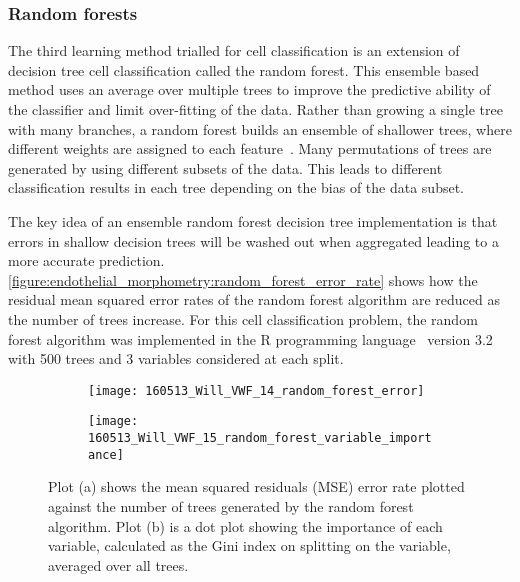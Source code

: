 \subsubsection{Random forests}
The third learning method trialled for cell classification is an extension of decision tree cell classification called the random forest. This ensemble based method uses an average over multiple trees to improve the predictive ability of the classifier and limit over-fitting of the data. Rather than growing a single tree with many branches, a random forest builds an ensemble of shallower trees, where different weights are assigned to each feature~\cite{Breiman2001}. Many permutations of trees are generated by using different subsets of the data. This leads to different classification results in each tree depending on the bias of the data subset.

The key idea of an ensemble random forest decision tree implementation is that errors in shallow decision trees will be washed out when aggregated leading to a more accurate prediction. \autoref{figure:endothelial_morphometry:random_forest_error_rate} shows how the residual mean squared error rates of the random forest algorithm are reduced as the number of trees increase. For this cell classification problem, the random forest algorithm was implemented in the R programming language~\cite{RCoreTeam2014} version 3.2 with 500 trees and 3 variables considered at each split.

\begin{figure}[htbp]\centering
	\begin{subfigure}[b]{0.70\linewidth}
		\centering
		\texttt{[image: 160513\_Will\_VWF\_14\_random\_forest\_error]}
		\caption{}
		\label{figure:endothelial_morphometry:random_forest_error_rate}
	\end{subfigure}
	\begin{subfigure}[b]{0.79\linewidth}
		\centering
		\texttt{[image: 160513\_Will\_VWF\_15\_random\_forest\_variable\_importance]}
		\caption{}
		\label{figure:endothelial_morphometry:random_forest_variable_importance}
	\end{subfigure}
	\caption[Error rate and variable importance in random forest trees]{Plot (a) shows the mean squared residuals (MSE) error rate plotted against the number of trees generated by the random forest algorithm. Plot (b) is a dot plot showing the importance of each variable, calculated as the Gini index on splitting on the variable, averaged over all trees.}
\label{figure:endothelial_morphometry:random_forest_stats}
\end{figure}

